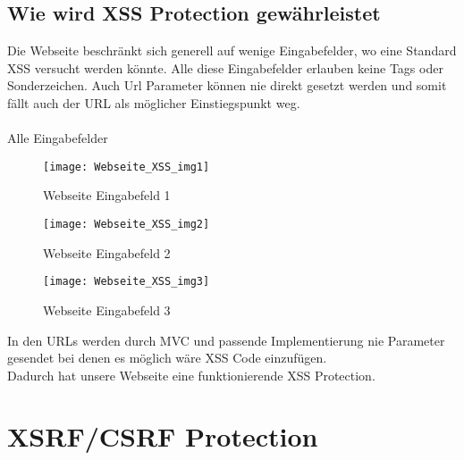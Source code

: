 {\subsection{Wie wird XSS Protection gewährleistet}
\label{sec:xss_prot}
Die Webseite beschränkt sich generell auf wenige Eingabefelder, wo eine Standard XSS versucht werden könnte. Alle diese Eingabefelder erlauben keine Tags oder Sonderzeichen. Auch Url Parameter können nie direkt gesetzt werden und somit fällt auch der URL als möglicher Einstiegspunkt weg.\\ \\Alle Eingabefelder
\begin{figure}[H]
    \texttt{[image: Webseite\_XSS\_img1]}
    \caption{Webseite Eingabefeld 1}
    \label{fig:webxxs1}
\end{figure}
\begin{figure}[H]
    \texttt{[image: Webseite\_XSS\_img2]}
    \caption{Webseite Eingabefeld 2}
    \label{fig:webxxs1}
\end{figure}
\begin{figure}[H]
    \texttt{[image: Webseite\_XSS\_img3]}
    \caption{Webseite Eingabefeld 3}
    \label{fig:webxxs1}
\end{figure}
In den URLs werden durch MVC und passende Implementierung nie Parameter gesendet bei denen es möglich wäre XSS Code einzufügen.\\
Dadurch hat unsere Webseite eine funktionierende XSS Protection.
\section{XSRF/CSRF Protection}
\label{sec:csrf}
}

